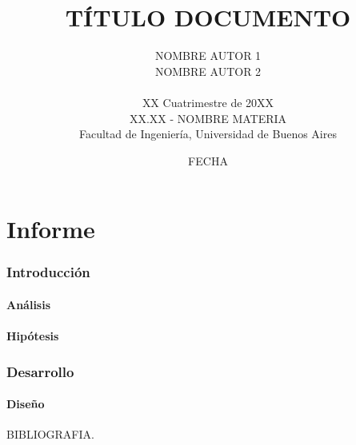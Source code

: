 \documentclass[a4paper,11pt]{article}
\title{\textbf{TÍTULO DOCUMENTO}}
\author{
	NOMBRE AUTOR 1\\
	NOMBRE AUTOR 2\\
  \\
  \normalsize{XX Cuatrimestre de 20XX}							\\
  \normalsize{XX.XX - NOMBRE MATERIA}							\\
  \normalsize{Facultad de Ingeniería, Universidad de Buenos Aires}
}
\date{FECHA}
\begin{document}
	\thispagestyle{empty}
	\maketitle

	\begin{abstract}

		

	\end{abstract}

	\clearpage

	\tableofcontents
	\clearpage


	\part{Informe}
		\section{Introducción}
		
			\subsection{Análisis}
			 
			\subsection{Hipótesis}
			 

		\newpage
		\section{Desarrollo}
		 
			\subsection{Diseño}
			 
	\newpage

	
	

	\begin{thebibliography}{99}
		 BIBLIOGRAFIA.
	\end{thebibliography}
\end{document}
